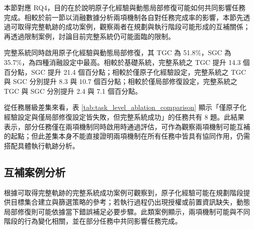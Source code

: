 \begin{ZhChapter}
本節對應 RQ4，目的在於說明原子化經驗與動態局部修復可能如何共同影響任務完成。相較於前一節以消融數據分析兩項機制各自對任務完成率的影響，本節先透過可取得完整軌跡的成功案例，觀察兩者在規劃與執行階段可能形成的互補關係；再透過限制案例，討論目前完整系統仍可能面臨的限制。

完整系統同時啟用原子化經驗與動態局部修復，其 TGC 為 51.8\%，SGC 為 35.7\%，為四種消融設定中最高。相較於基礎系統，完整系統之 TGC 提升 14.3 個百分點，SGC 提升 21.4 個百分點；相較於僅原子化經驗設定，完整系統之 TGC 與 SGC 分別提升 8.3 與 10.7 個百分點；相較於僅局部修復設定，完整系統之 TGC 與 SGC 分別提升 2.4 與 7.1 個百分點。

從任務層級差集來看，表 \ref{tab:task_level_ablation_comparison} 顯示「僅原子化經驗設定與僅局部修復設定皆失敗，但完整系統成功」的任務共有 8 題。此結果表示，部分任務僅在兩項機制同時啟用時通過評估，可作為觀察兩項機制可能互補的起點；但此差集本身不能直接證明兩項機制在所有任務中皆具有協同作用，仍需搭配具體執行軌跡分析。

\subsection*{互補案例分析}

根據可取得完整軌跡的完整系統成功案例可觀察到，原子化經驗可能在規劃階段提供目標集合建立與篩選策略的參考；若執行過程仍出現授權或前置資訊缺失，動態局部修復則可能依據當下錯誤補足必要步驟。此類案例顯示，兩項機制可能與不同階段的行為變化相關，並在部分任務中共同影響任務完成。


\end{ZhChapter}
